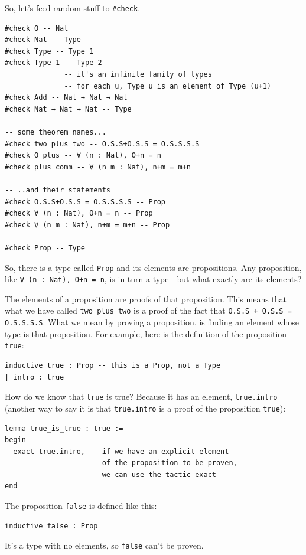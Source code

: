 \documentclass{book}
\theoremstyle{definition}
\theoremstyle{remark}
\theoremstyle{plain}
\begin{document}
So, let's feed random stuff to \lstinline{#check}.
\begin{lstlisting}
#check O -- Nat
#check Nat -- Type
#check Type -- Type 1
#check Type 1 -- Type 2
              -- it's an infinite family of types
              -- for each u, Type u is an element of Type (u+1)
#check Add -- Nat → Nat → Nat
#check Nat → Nat → Nat -- Type

-- some theorem names...
#check two_plus_two -- O.S.S+O.S.S = O.S.S.S.S
#check O_plus -- ∀ (n : Nat), O+n = n
#check plus_comm -- ∀ (n m : Nat), n+m = m+n

-- ..and their statements
#check O.S.S+O.S.S = O.S.S.S.S -- Prop
#check ∀ (n : Nat), O+n = n -- Prop
#check ∀ (n m : Nat), n+m = m+n -- Prop

#check Prop -- Type
\end{lstlisting}
So, there is a type called \lstinline{Prop} and its elements are propositions.
Any proposition, like \lstinline{∀ (n : Nat), O+n = n}, is in turn a type - but what exactly are its elements?

The elements of a proposition are proofs of that proposition.
This means that what we have called \lstinline{two_plus_two} is a proof of the fact that \lstinline{O.S.S + O.S.S = O.S.S.S.S}.
What we mean by proving a proposition, is finding an element whose type is that proposition.
For example, here is the definition of the proposition \lstinline{true}:
\begin{lstlisting}
inductive true : Prop -- this is a Prop, not a Type
| intro : true    
\end{lstlisting}
How do we know that \lstinline{true} is true? Because it has an element, \lstinline{true.intro}
(another way to say it is that \lstinline{true.intro} is a proof of the proposition \lstinline{true}):
\begin{lstlisting}
lemma true_is_true : true :=
begin
  exact true.intro, -- if we have an explicit element
                    -- of the proposition to be proven,
                    -- we can use the tactic exact
end
\end{lstlisting}

The proposition \lstinline{false} is defined like this:
\begin{lstlisting}
inductive false : Prop  
\end{lstlisting}
It's a type with no elements, so \lstinline{false} can't be proven.
\end{document}
